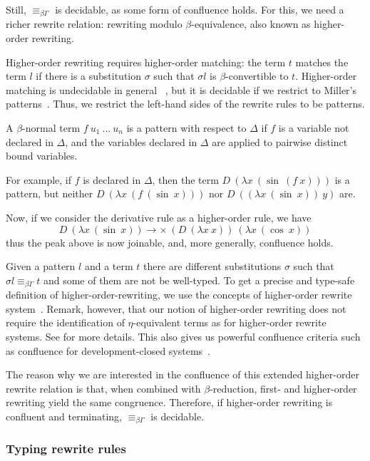 \documentclass[english]{lipics}
\newcommand\lra{\longrightarrow}
\newcommand\eqbg{\equiv_{\beta\Gamma}}
\begin{document}
Still, $\eqbg$ is decidable, as some form of confluence holds. For
this, we need a richer rewrite relation: rewriting modulo
$\beta$-equivalence, also known as higher-order rewriting.

Higher-order rewriting requires higher-order matching: the term $t$
matches the term $l$ if there is a substitution
$\sigma$ such that $\sigma l$ is $\beta$-convertible to
$t$. Higher-order matching is undecidable in general~
\cite{Dowek91,DBLP:journals/igpl/Loader03}, but it is decidable if
we restrict to Miller's patterns~\cite{Miller91alogic}.  Thus, we
restrict the left-hand sides of the rewrite rules to be patterns.

\begin{definition}
A $\beta$-normal term $f~u_1~...~u_n$ is a pattern with respect to
$\Delta$ if $f$ is a variable not declared in $\Delta$, and the
variables declared in $\Delta$ are applied to pairwise distinct
bound variables.
\end{definition}

For example, if $f$ is declared in $\Delta$, then the term
$D~(\lambda x~(\sin~(f~x)))$ is a pattern, but neither $D~(\lambda
x~(f~(\sin~x)))$ nor $D~((\lambda x~(\sin~x))~y)$ are.

Now, if we consider the derivative rule as a higher-order rule, we have
$$D~(\lambda x~(\sin~x)) \lra \times~(D~(\lambda x~x))~(\lambda x~(\cos~x))$$
thus the peak above is now joinable, and, more generally, confluence
holds.

Given a pattern $l$ and a term $t$ there are different substitutions
$\sigma$ such that $\sigma l \eqbg t$ and some of them are not be well-typed.
To get a precise
and type-safe definition of higher-order-rewriting, we use the
concepts of higher-order rewrite system~\cite{Nipkow-LICS-91}. Remark, however, that
our notion of higher-order rewriting does not require the identification of $\eta$-equivalent terms
as for higher-order rewrite systems.  See
\cite{RSai15} for more details. This also gives us powerful confluence
criteria such as confluence for development-closed
systems~\cite{DBLP:conf/hoa/Oostrom95}.


The reason why we are interested in the confluence of this extended
higher-order rewrite relation is that, when combined with
$\beta$-reduction, first- and higher-order rewriting yield the same
congruence. Therefore, if higher-order rewriting is confluent and
terminating, $\eqbg$ is decidable.

\subsubsection{Typing rewrite rules}
\label{subsec:typingrewriterules}
\end{document}

